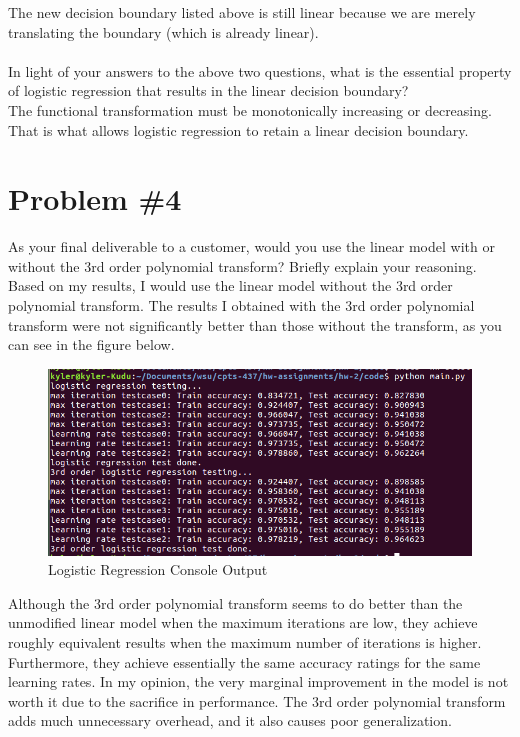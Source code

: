 \documentclass[12pt]{article}
\begin{document}
	The new decision boundary listed above is still linear because we are merely translating the boundary (which is already linear).
	\\ \\
	In light of your answers to the above two questions, what is the essential property of logistic regression that results in the linear decision boundary? \\
	The functional transformation must be monotonically increasing or decreasing. That is what allows logistic regression to retain a linear decision boundary.
	
	
	
	
	\section*{Problem \#4}
	As your final deliverable to a customer, would you use the linear model with or without the 3rd order polynomial transform? Briefly explain your reasoning. \\
	Based on my results, I would use the linear model without the 3rd order polynomial transform. The results I obtained with the 3rd order polynomial transform were not significantly better than those without the transform, as you can see in the figure below.
	\begin{figure}[h]
		\begin{center}
			\includegraphics[width=\linewidth]{hw2_results.png}
			\caption{Logistic Regression Console Output}
			\label{fig:log_reg_results}
		\end{center}
	\end{figure}
	Although the 3rd order polynomial transform seems to do better than the unmodified linear model when the maximum iterations are low, they achieve roughly equivalent results when the maximum number of iterations is higher. Furthermore, they achieve essentially the same accuracy ratings for the same learning rates. In my opinion, the very marginal improvement in the model is not worth it due to the sacrifice in performance. The 3rd order polynomial transform adds much unnecessary overhead, and it also causes poor generalization.
	
\end{document}
